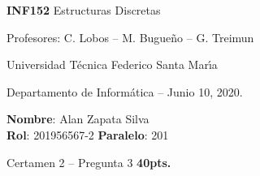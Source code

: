 \documentclass[letterpaper,10pt]{article}
\begin{document}
\thispagestyle{empty}

\begin{minipage}[t]{0.6\textwidth}

{\LARGE \textbf{INF152} Estructuras Discretas}

{\large Profesores: C. Lobos -- M. Bugueño -- G. Treimun}

Universidad T\'ecnica Federico Santa Mar\'{\i}a

Departamento de Inform\'atica -- Junio 10, 2020.

\end{minipage}
\hfill
\begin{minipage}[t]{0.35\textwidth}
\textbf{Nombre}: Alan Zapata Silva\\[0.3cm]
\textbf{Rol}: 201956567-2 \textbf{Paralelo}: 201
\end{minipage}

\vspace{0.4cm}

{\Large Certamen 2 -- Pregunta 3 \textbf{40pts.}} 

\vspace{0.4cm}
\end{document}
